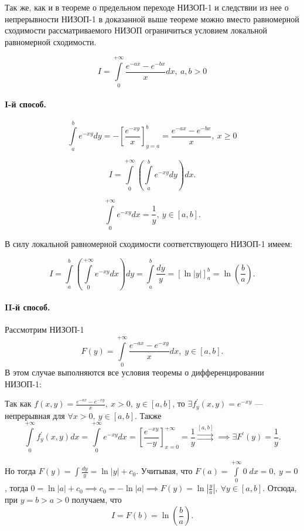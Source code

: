 \documentclass[../../main.tex]{subfiles}
\begin{document}
\begin{rem}
	Так же, как и в теореме о предельном переходе НИЗОП-1 и следствии из нее о 
	непрерывности НИЗОП-1 в доказанной выше теореме можно вместо равномерной 
	сходимости рассматриваемого НИЗОП ограничиться условием локальной равномерной 
	сходимости.
\end{rem}

\begin{exmp}
	\[
	I = \int\limits_0^{+\infty} \frac{e^{-ax} - e^{-bx}}{x} dx,\ a, b > 0
	\]
	
	\paragraph{I-й способ.}
	\[
	\int\limits_a^b e^{-xy} dy = -\left[ \frac{e^{-xy}}{x} \right]^{b}_{y = a} = 
	\frac{e^{-ax} - e^{-bx}}{x}, \ x \geq 0
	\]
	
	\[
	I = \int\limits_0^{+\infty} \left( \int\limits_a^b e^{-xy} dy \right) dx.
	\]
	
	\[
	\int\limits_0^{+\infty} e^{-xy} dx = \frac{1}{y},\  y \in [a, b].
	\]
	
	 В силу локальной равномерной сходимости соответствующего НИЗОП-1 имеем:
	 
	 \[
	 I = \int\limits_a^b \left( \int\limits_0^{+\infty} e^{-xy} dx \right) dy = 
	 \int\limits_a^b \frac{dy}{y} = \left[ \ln|y| \right]^b_a = 
	 \ln\left(\frac{b}{a}\right).
	 \]
	 
	 \paragraph{II-й способ.}
	 Рассмотрим НИЗОП-1 \[\displaystyle F(y) = \int\limits_0^{+\infty} 
	 \frac{e^{-ax} - e^{-xy}}{x} dx, \; y \in [a, b].\] В этом случае выполняются 
	 все условия теоремы о дифференцировании НИЗОП-1:
	 
	 Так как $\displaystyle f(x, y) = \frac{e^{-ax} - e^{-xy}}{x},\ x > 0,\ y \in 
	 [a, b]$, то $\exists f^{'}_y (x, y) = e^{-xy}$
	  --- непрерывная для 
	 $\forall x > 0,\ y \in [a, b]$. Также
	 \[\displaystyle \int\limits_0^{+\infty} f^{'}_y (x, y) dx = 
	 \int\limits^{+\infty}_0 e^{-xy} dx = \left[ \frac{e^{-xy}}{-y} 
	 \right]^{+\infty}_{x = 0} = \frac{1}{y} \overset{[a, b]}\rightrightarrows 
	 \implies \exists F^{'} (y) = \frac{1}{y}.\]
	 
	 Но тогда $\displaystyle F(y) = \int \frac{dy}{y} = \ln|y| + c_0$. Учитывая, 
	 что 
	 $\displaystyle F(a) = \int\limits_0^{+\infty} 0\;dx = 0,\ y = 0$, тогда $0 = 
	 \ln|a| + c_0 \implies c_0 = -\ln|a| \implies F(y) = \ln\left| \frac{y}{a} 
	 \right|,\ \forall y \in [a, b].$ Отсюда, при $y = b > a > 0$ получаем, что
	 \[
	 I = F(b) = \ln\left(\frac{b}{a}\right).
	 \]
\end{exmp}
\end{document}
